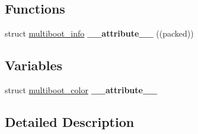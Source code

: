 \subsection*{Functions}
\begin{DoxyCompactItemize}
\item 
struct \hyperlink{structmultiboot__info}{multiboot\+\_\+info} {\bfseries \+\_\+\+\_\+attribute\+\_\+\+\_\+} ((packed))\hypertarget{group__multiboot__header_ga790f11199c480beccf144a2b5fe3c149}{}\label{group__multiboot__header_ga790f11199c480beccf144a2b5fe3c149}

\end{DoxyCompactItemize}
\subsection*{Variables}
\begin{DoxyCompactItemize}
\item 
struct \hyperlink{structmultiboot__color}{multiboot\+\_\+color} {\bfseries \+\_\+\+\_\+attribute\+\_\+\+\_\+}\hypertarget{group__multiboot__header_ga4bbf25084dee10ec29f4356cacced463}{}\label{group__multiboot__header_ga4bbf25084dee10ec29f4356cacced463}

\end{DoxyCompactItemize}


\subsection{Detailed Description}
